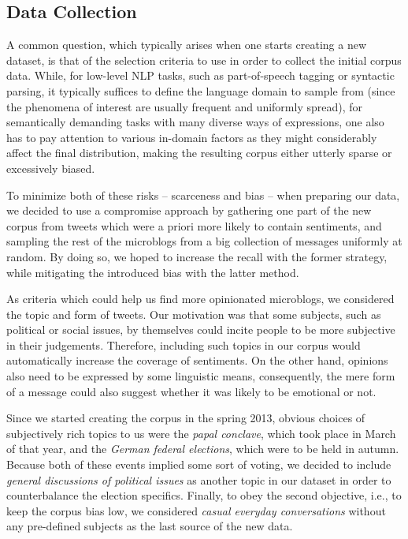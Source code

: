 \subsection{Data Collection}

A common question, which typically arises when one starts creating a
new dataset, is that of the selection criteria to use in order to
collect the initial corpus data.  While, for low-level NLP tasks, such
as part-of-speech tagging or syntactic parsing, it typically suffices
to define the language domain to sample from (since the phenomena of
interest are usually frequent and uniformly spread), for semantically
demanding tasks with many diverse ways of expressions, one also has to
pay attention to various in-domain factors as they might considerably
affect the final distribution, making the resulting corpus either
utterly sparse or excessively biased.

To minimize both of these risks -- scarceness and bias -- when
preparing our data, we decided to use a compromise approach by
gathering one part of the new corpus from tweets which were a priori
more likely to contain sentiments, and sampling the rest of the
microblogs from a big collection of messages uniformly at random.  By
doing so, we hoped to increase the recall with the former strategy,
while mitigating the introduced bias with the latter method.

As criteria which could help us find more opinionated microblogs, we
considered the topic and form of tweets.  Our motivation was that some
subjects, such as political or social issues, by themselves could
incite people to be more subjective in their judgements.  Therefore,
including such topics in our corpus would automatically increase the
coverage of sentiments.  On the other hand, opinions also need to be
expressed by some linguistic means, consequently, the mere form of a
message could also suggest whether it was likely to be emotional or
not.

Since we started creating the corpus in the spring 2013, obvious
choices of subjectively rich topics to us were the \emph{papal
  conclave}, which took place in March of that year, and the
\emph{German federal elections}, which were to be held in autumn.
Because both of these events implied some sort of voting, we decided
to include \emph{general discussions of political issues} as another
topic in our dataset in order to counterbalance the election
specifics.  Finally, to obey the second objective, i.e., to keep the
corpus bias low, we considered \emph{casual everyday conversations}
without any pre-defined subjects as the last source of the new data.

